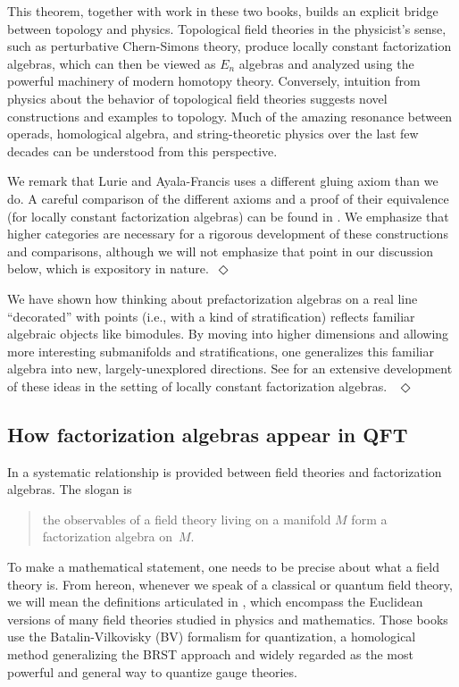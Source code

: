 \documentclass[11pt]{amsart}
\begin{document}
This theorem, together with work in these two books, builds an explicit bridge between topology and physics. Topological field theories in the physicist's sense, such as perturbative Chern-Simons theory, produce locally constant factorization algebras, which can then be viewed as $E_n$ algebras and analyzed using the powerful machinery of modern homotopy theory. Conversely, intuition from physics about the behavior of topological field theories suggests novel constructions and examples to topology. Much of the amazing resonance between operads, homological algebra, and string-theoretic physics over the last few decades can be understood from this perspective.

\begin{rmk}
We remark that Lurie and Ayala-Francis uses a different gluing axiom than we do. A careful comparison of the different axioms and a proof of their equivalence (for locally constant factorization algebras) can be found in \cite{Matsuoka}. We emphasize that higher categories are necessary for a rigorous development of these constructions and comparisons, although we will not emphasize that point in our discussion below, which is expository in nature.~\hfill $\Diamond$
\end{rmk}

\begin{rmk}
We have shown how thinking about prefactorization algebras on a real line ``decorated'' with points (i.e., with a kind of stratification) reflects familiar algebraic objects like bimodules. By moving into higher dimensions and allowing more interesting submanifolds and stratifications, one generalizes this familiar algebra into new, largely-unexplored directions. See \cite{AyalaFrancisTanaka} for an extensive development of these ideas in the setting of locally constant factorization algebras.
~\hfill $\Diamond$
\end{rmk}

\subsection{How factorization algebras appear in QFT}

In \cite{CG1, CG2} a systematic relationship is provided between field theories and factorization algebras.
The slogan is 
\begin{quote}
the observables of a field theory living on a manifold $M$ form a factorization algebra on~$M$. 
\end{quote}
To make a mathematical statement, one needs to be precise about what a field theory is.
From hereon, whenever we speak of a classical or quantum field theory, we will mean the definitions articulated in \cite{CosBook,CG1, CG2}, which encompass the Euclidean versions of many field theories studied in physics and mathematics.
Those books use the Batalin-Vilkovisky (BV) formalism for quantization, a homological method generalizing the BRST approach and widely regarded as the most powerful and general way to quantize gauge theories. 
\end{document}
